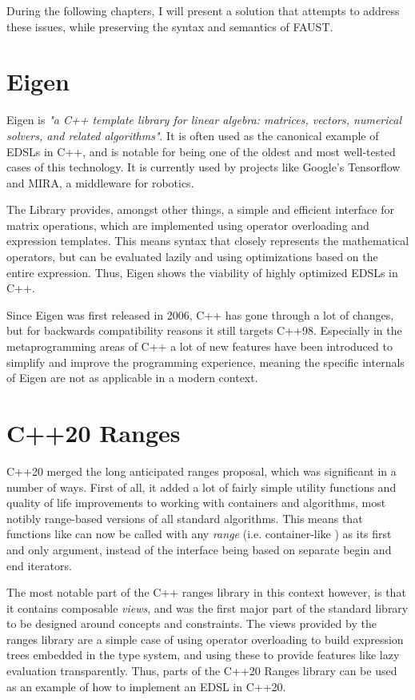 During the following chapters, I will present a solution that attempts to address these issues, while
preserving the syntax and semantics of FAUST.

\section{Eigen}

Eigen is \emph{"a C++ template library for linear algebra: matrices, vectors, numerical solvers, and related algorithms"}\autocite{eigenweb}. It is often used as the canonical example of EDSLs in
C++, and is notable for being one of the oldest and most well-tested cases of this technology. It is
currently used by projects like Google's Tensorflow\autocite{tensorflow2015-whitepaper} and MIRA, a middleware for
robotics\autocite{Einhorn2012-bx}.

The Library provides, amongst other things, a simple and efficient interface for matrix operations, which are
implemented using operator overloading and expression templates. This means syntax that closely represents
the mathematical operators, but can be evaluated lazily and using optimizations based on the entire
expression. Thus, Eigen shows the viability of highly optimized EDSLs in C++.

Since Eigen was first released in 2006, C++ has gone through a lot of changes, but for backwards
compatibility reasons it still targets C++98. Especially in the metaprogramming areas of C++ a lot of new
features have been introduced to simplify and improve the programming experience, meaning the specific
internals of Eigen are not as applicable in a modern context.

\section{C++20 Ranges}

C++20\autocite{C++Std} merged the long anticipated ranges proposal\autocite{P0896R4}, which was
significant in a number of ways. First of all, it added a lot of fairly simple utility functions and quality
of life improvements to working with containers and algorithms, most notibly range-based versions of all
standard algorithms. This means that functions like  can now be called with any \emph{range} (i.e. container-like ) as
its first and only argument, instead of the interface being based on separate begin and end iterators.

The most notable part of the C++ ranges library in this context however, is that it contains composable
\emph{views}, and was the first major part of the standard library to be designed around concepts
and constraints\autocite{N4674}. The views provided by the ranges library are a simple case of using
operator overloading to build expression trees embedded in the type system, and using these to provide
features like lazy evaluation transparently. Thus, parts of the C++20 Ranges library can be used as an
example of how to implement an EDSL in C++20.

